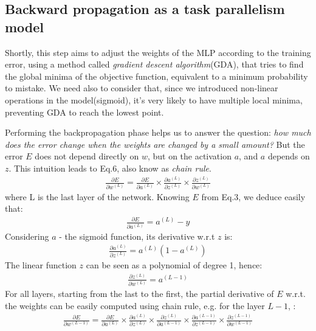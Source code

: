 \documentclass{article}
\begin{document}
	
	\subsection{Backward propagation as a task parallelism model}
	
	Shortly, this step aims to adjust the weights of the MLP according to the training error, using a method called \textit{gradient descent algorithm}(GDA), that tries to find the global minima of the objective function, equivalent to a minimum probability to mistake.
	We need also to consider that, since we introduced non-linear operations in the model(sigmoid), it's very likely to have multiple local minima, preventing GDA to reach the lowest point.
	
	Performing the backpropagation phase helps us to answer the question: \textit{how much does the error change when the weights are changed by a small amount?} But the error $E$ does not depend directly on $w$, but on the activation $a$, and $a$ depends on $z$. This intuition leads to Eq.6, also know as \textit{chain rule}.
	\begin{eqnarray}
		\frac{\partial E}{\partial w^{(L)}} = \frac{\partial E}{\partial a^{(L)}} \times \frac{\partial a^{(L)}}{\partial z^{(L)}} \times \frac{\partial z^{(L)}}{\partial w^{(L)}}
	\end{eqnarray}
	where L is the last layer of the network. Knowing $E$ from Eq.3, we deduce easily that:
	\begin{eqnarray}
		\frac{\partial E}{\partial a^{(L)}} = a^{(L)} - y
	\end{eqnarray}
	Considering $a$ - the sigmoid function, its derivative w.r.t $z$ is:
	\begin{eqnarray}
		\frac{\partial a^{(L)}}{\partial z^{(L)}} = a^{(L)}(1 - a^{(L)})
	\end{eqnarray}
	The linear function $z$ can be seen as a polynomial of degree 1, hence:
	\begin{eqnarray}
		\frac{\partial z^{(L)}}{\partial w^{(L)}} = a^{(L-1)}
	\end{eqnarray}
	For all layers, starting from the last to the first, the partial derivative of $E$ w.r.t. the weights can be easily computed using chain rule, e.g. for the layer $L-1$, :
	\begin{eqnarray}
		\frac{\partial E}{\partial w^{(L-1)}} = \frac{\partial E}{\partial a^{(L)}} \times 
		\frac{\partial a^{(L)}}{\partial z^{(L)}} \times 
		\frac{\partial z^{(L)}}{\partial a^{(L-1)}} \times
		\frac{\partial a^{(L-1)}}{\partial z^{(L-1)}} \times 
		\frac{\partial z^{(L-1)}}{\partial w^{(L-1)}}
	\end{eqnarray}
	
\end{document}
